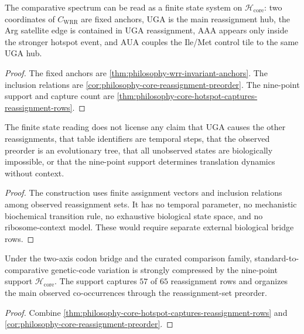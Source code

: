 \begin{corollary}
\label{cor:philosophy-hotspot-core-finite-state-reading}
The comparative spectrum can be read as a finite state system on
$\mathcal H_{\mathrm{core}}$: two coordinates of $C_{\mathrm{WRR}}$ are
fixed anchors, $\mathrm{UGA}$ is the main reassignment hub, the Arg
satellite edge is contained in UGA reassignment, $\mathrm{AAA}$ appears
only inside the stronger hotspot event, and $\mathrm{AUA}$ couples the
Ile/Met control tile to the same UGA hub.
\end{corollary}
\begin{proof}
The fixed anchors are \autoref{thm:philosophy-wrr-invariant-anchors}.
The inclusion relations are
\autoref{cor:philosophy-core-reassignment-preorder}. The nine-point
support and capture count are
\autoref{thm:philosophy-core-hotspot-captures-reassignment-rows}.
\end{proof}

\begin{theorem}
\label{thm:philosophy-hotspot-state-system-cannot-claim-boundary}
The finite state reading does not license any claim that $\mathrm{UGA}$
causes the other reassignments, that table identifiers are temporal
steps, that the observed preorder is an evolutionary tree, that all
unobserved states are biologically impossible, or that the nine-point
support determines translation dynamics without context.
\end{theorem}
\begin{proof}
The construction uses finite assignment vectors and inclusion relations
among observed reassignment sets. It has no temporal parameter, no
mechanistic biochemical transition rule, no exhaustive biological state
space, and no ribosome-context model. These would require separate
external biological bridge rows.
\end{proof}

\begin{corollary}
\label{cor:philosophy-hotspot-state-system-allowed-claim}
Under the two-axis codon bridge and the curated comparison family,
standard-to-comparative genetic-code variation is strongly compressed by
the nine-point support $\mathcal H_{\mathrm{core}}$. The support captures
$57$ of $65$ reassignment rows and organizes the main observed
co-occurrences through the reassignment-set preorder.
\end{corollary}
\begin{proof}
Combine \autoref{thm:philosophy-core-hotspot-captures-reassignment-rows}
and \autoref{cor:philosophy-core-reassignment-preorder}.
\end{proof}

